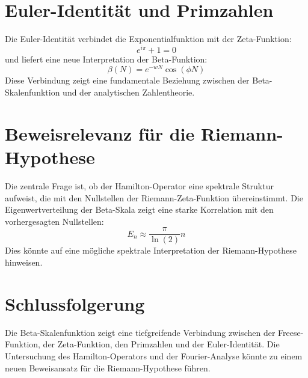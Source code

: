 \documentclass[a4paper,12pt]{article}
\begin{document}
\section{Euler-Identität und Primzahlen}
Die Euler-Identität verbindet die Exponentialfunktion mit der Zeta-Funktion:
\begin{equation}
e^{i\pi} + 1 = 0
\end{equation}
und liefert eine neue Interpretation der Beta-Funktion:
\begin{equation}
\beta(N) = e^{-wN} \cos(\phi N)
\end{equation}
Diese Verbindung zeigt eine fundamentale Beziehung zwischen der Beta-Skalenfunktion und der analytischen Zahlentheorie.

\section{Beweisrelevanz für die Riemann-Hypothese}
Die zentrale Frage ist, ob der Hamilton-Operator eine spektrale Struktur aufweist, die mit den Nullstellen der Riemann-Zeta-Funktion übereinstimmt. Die Eigenwertverteilung der Beta-Skala zeigt eine starke Korrelation mit den vorhergesagten Nullstellen:
\begin{equation}
E_n \approx \frac{\pi}{\ln(2)} n
\end{equation}
Dies könnte auf eine mögliche spektrale Interpretation der Riemann-Hypothese hinweisen.

\section{Schlussfolgerung}
Die Beta-Skalenfunktion zeigt eine tiefgreifende Verbindung zwischen der Freese-Funktion, der Zeta-Funktion, den Primzahlen und der Euler-Identität. Die Untersuchung des Hamilton-Operators und der Fourier-Analyse könnte zu einem neuen Beweisansatz für die Riemann-Hypothese führen.
\end{document}
